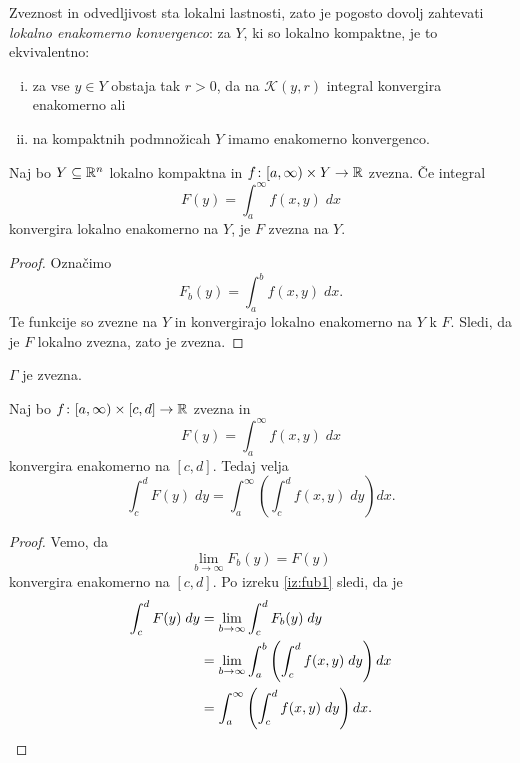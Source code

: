 \begin{opomba}
Zveznost in odvedljivost sta lokalni lastnosti, zato je pogosto
dovolj zahtevati \emph{lokalno enakomerno konvergenco}: za $Y$, ki
so lokalno kompaktne, je to ekvivalentno:

\begin{enumerate}[i)]
\item za vse $y \in Y$ obstaja tak $r > 0$, da na
$\mathcal{K}(y,r)$ integral konvergira enakomerno ali
\item na kompaktnih podmnožicah $Y$ imamo enakomerno konvergenco.
\end{enumerate}
\end{opomba}

\begin{izrek}
Naj bo $Y \subseteq \mathbb{R}^n$ lokalno kompaktna in
$f \colon [a,\infty) \times Y \to \mathbb{R}$ zvezna. Če integral
\[
F(y) = \int_a^\infty f(x,y)\;dx
\]
konvergira lokalno enakomerno na $Y$, je $F$ zvezna na $Y$.
\end{izrek}

\begin{proof}
Označimo
\[
F_b(y) = \int_a^b f(x,y)\;dx.
\]
Te funkcije so zvezne na $Y$ in konvergirajo lokalno enakomerno na
$Y$ k $F$. Sledi, da je $F$ lokalno zvezna, zato je zvezna.
\end{proof}

\begin{posledica}
$\Gamma$ je zvezna.
\end{posledica}

\begin{izrek}[Fubini]
Naj bo $f \colon [a,\infty) \times [c,d] \to \mathbb{R}$ zvezna in
\[
F(y) = \int_a^\infty f(x,y)\;dx
\]
konvergira enakomerno na $[c,d]$. Tedaj velja
\[
\int_c^d F(y)\;dy =
\int_a^\infty \left(\int_c^d f(x,y)\;dy\right) dx.
\]
\end{izrek}

\begin{proof}
Vemo, da
\[
\lim_{b \to \infty} F_b(y) = F(y)
\]
konvergira enakomerno na $[c,d]$. Po izreku \ref{iz:fub1} sledi, da
je
\begin{align*}
\int_c^d F(y)\;dy &=
\lim_{b \to \infty} \int_c^d F_b(y)\;dy
\\
&=
\lim_{b \to \infty} \int_a^b \left(\int_c^d f(x,y)\;dy\right) dx
\\
&=
\int_a^\infty \left(\int_c^d f(x,y)\;dy\right) dx. \qedhere
\end{align*}
\end{proof}

